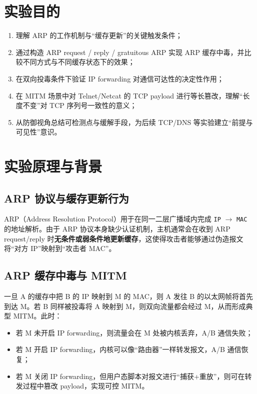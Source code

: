 \documentclass[12pt,hyperref,a4paper,UTF8,fontset=none]{ctexart}
\begin{document}
\cover

\begin{abstract}
本报告记录“实验二：ARP 缓存中毒攻击”的实验目标、环境搭建、实施步骤、关键现象与深入分析。实验重点包括：使用 ARP request / ARP reply / gratuitous ARP 三种方式投毒缓存；在双向投毒条件下，通过开关 IP forwarding 观察链路恢复与中断；并在 Telnet 与 Netcat 场景中实现中间人（MITM）流量篡改。

\textbf{关键词}: ARP, ARP poisoning, MITM, Scapy, IP forwarding
\end{abstract}

\tableofcontents
\newpage

\section{实验目的}
\begin{enumerate}
    \item 理解 ARP 的工作机制与“缓存更新”的关键触发条件；
    \item 通过构造 ARP request / reply / gratuitous ARP 实现 ARP 缓存中毒，并比较不同方式与不同缓存状态下的效果；
    \item 在双向投毒条件下验证 IP forwarding 对通信可达性的决定性作用；
    \item 在 MITM 场景中对 Telnet/Netcat 的 TCP payload 进行等长篡改，理解“长度不变”对 TCP 序列号一致性的意义；
    \item 从防御视角总结可检测点与缓解手段，为后续 TCP/DNS 等实验建立“前提与可见性”意识。
\end{enumerate}

\section{实验原理与背景}

\subsection{ARP 协议与缓存更新行为}
ARP（Address Resolution Protocol）用于在同一二层广播域内完成 \texttt{IP} $\rightarrow$ \texttt{MAC} 的地址解析。由于 ARP 协议本身缺少认证机制，主机通常会在收到 ARP request/reply 时\textbf{无条件或弱条件地更新缓存}，这使得攻击者能够通过伪造报文将“对方 IP”映射到“攻击者 MAC”。

\subsection{ARP 缓存中毒与 MITM}
一旦 A 的缓存中把 B 的 IP 映射到 M 的 MAC，则 A 发往 B 的以太网帧将首先到达 M。若 B 同样被投毒将 A 映射到 M，则双向流量都会经过 M，从而形成典型 MITM。此时：
\begin{itemize}
    \item 若 M 未开启 IP forwarding，则流量会在 M 处被内核丢弃，A/B 通信失败；
    \item 若 M 开启 IP forwarding，内核可以像“路由器”一样转发报文，A/B 通信恢复；
    \item 若 M 关闭 IP forwarding，但用户态脚本对报文进行“捕获+重放”，则可在转发过程中篡改 payload，实现可控 MITM。
\end{itemize}
\end{document}
